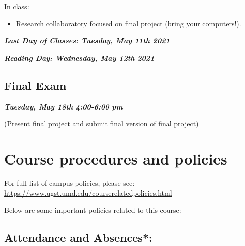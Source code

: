 \documentclass[
]{book}
\providecommand{\tightlist}{%
  \setlength{\itemsep}{0pt}\setlength{\parskip}{0pt}}
\begin{document}
In class:

\begin{itemize}
\tightlist
\item
  Research collaboratory focused on final project (bring your computers!).
\end{itemize}

\textbf{\emph{Last Day of Classes: Tuesday, May 11th 2021}}

\textbf{\emph{Reading Day: Wednesday, May 12th 2021}}

\hypertarget{final-exam}{%
\subsection{Final Exam}\label{final-exam}}

\textbf{\emph{Tuesday, May 18th 4:00-6:00 pm}}

(Present final project and submit final version of final project)

\hypertarget{course-procedures-and-policies}{%
\section{Course procedures and policies}\label{course-procedures-and-policies}}

For full list of campus policies, please see: \url{https://www.ugst.umd.edu/courserelatedpolicies.html}

Below are some important policies related to this course:

\hypertarget{attendance-and-absences}{%
\subsection{Attendance and Absences*:}\label{attendance-and-absences}}
\end{document}
